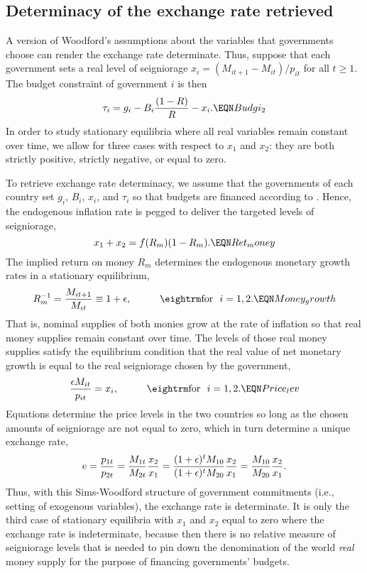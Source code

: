 \subsection{Determinacy of the exchange rate retrieved}\label{Kareken-Wallace-fiscal}%
  A version of Woodford's assumptions about the variables
 that governments choose can render the exchange rate determinate.
Thus,  suppose that each
government sets a real level of seigniorage
$x_i = (M_{it+1} - M_{it} ) / p_{it}$ for all $t \geq 1$.
The budget constraint of government $i$ is then
$$ \tau_i = g_i -  B_{i}{(1-R)\over R}
   - x_i .  \EQN Budgi_2 $$
In order to study stationary equilibria where all real variables remain
constant over time, we allow for three cases with respect to
$x_1$ and $x_2$: they are both strictly positive, strictly negative, or
equal to zero.


To retrieve exchange rate determinacy,  we assume
that the governments of each country set $g_i$, $B_i$,
$x_i$, and $\tau_i$ so that budgets are financed according
to .
Hence, the endogenous inflation rate is pegged to deliver the
targeted levels of seigniorage,
$$ x_1 +   x_2 = f(R_m)(1-R_m).  \EQN Ret_money $$
The implied return on money $R_m$ determines the endogenous
monetary growth rates in a stationary equilibrium,
$$ R_m^{-1} =  {M_{it+1} \over M_{it}}\equiv  1+\epsilon ,
                 \hskip1cm \hbox{\rm for\ \ }i=1,2.   \EQN Money_growth$$
That is, nominal supplies of both monies grow at the rate of
inflation so that real money supplies remain constant over time.
The levels of those real money supplies satisfy the equilibrium
condition that the real value of net monetary growth is equal to
the real seigniorage chosen by the government,
$$ { \epsilon M_{it} \over p_{it} } = x_i,
                 \hskip1cm \hbox{\rm for\ \ }i=1,2.      \EQN Price_lev  $$
Equations  determine the price levels in the two countries
so long as the chosen amounts of seigniorage are not equal to zero,
which in turn determine a unique exchange rate,
$$
e = { p_{1t} \over p_{2t} } = { M_{1t} \over M_{2t} } { x_2 \over x_1 }
= { (1+\epsilon)^t M_{10} \over (1+\epsilon)^t M_{20} } { x_2 \over x_1 }
= { M_{10} \over M_{20} } { x_2 \over x_1 }.
$$
Thus,
with this  Sims-Woodford structure of government commitments (i.e., setting
of exogenous variables), the exchange rate is determinate. It is only the
third case of stationary equilibria with $x_1$ and $x_2$ equal to zero
where the exchange rate is indeterminate, because then there is no
relative measure of seigniorage levels that is needed to pin down the
denomination of the world {\it real} money supply for the purpose
of financing governments' budgets.



